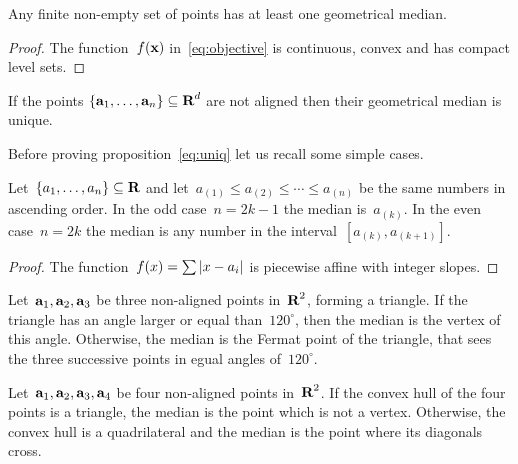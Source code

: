 \begin{proposition}
	Any finite non-empty set of points has at least one geometrical
	median.
\end{proposition}

\begin{proof}
	The function~$f(\textbf{x})$ in~\ref{eq:objective} is continuous, convex and
	has compact level sets.
\end{proof}

\begin{proposition}\label{eq:uniq}
If the points
\(
	\left\{\textbf{a}_1,\ldots,\textbf{a}_n\right\}\subseteq\textbf{R}^d
\)
are not aligned then their geometrical median is unique.
\end{proposition}

Before proving proposition~\ref{eq:uniq} let us recall some simple cases.

\begin{proposition}
Let~\( \left\{a_1,\ldots,a_n\right\}\subseteq\textbf{R} \)
and let~$a_{(1)}\le a_{(2)}\le\cdots\le a_{(n)}$
be the same numbers in
ascending order.  In the odd case~$n=2k-1$ the median is~$a_{(k)}$.  In the
even case~$n=2k$ the median is any number in the
interval~$\left[a_{(k)},a_{(k+1)}\right]$.
\end{proposition}

\begin{proof}
	The function~$f(x)=\sum \left|x-a_i\right|$ is piecewise affine with
	integer slopes.
\end{proof}

\begin{proposition}
	Let~$\textbf{a}_1,\textbf{a}_2,\textbf{a}_3$ be three non-aligned points in~$\textbf{R}^2$, forming a
	triangle.  If the triangle has an angle larger or equal
	than~$120^\circ$, then the median is the vertex of this angle.
	Otherwise, %
	the median is the Fermat point of the triangle, that sees the three
	successive points in egual angles of~$120^\circ$.
\end{proposition}

\begin{proposition}
	Let~$\textbf{a}_1,\textbf{a}_2,\textbf{a}_3,\textbf{a}_4$ be four non-aligned points in~$\textbf{R}^2$.  If the
	convex hull of the four points is a triangle, the median is the point
	which is not a vertex.  Otherwise, the convex hull is a quadrilateral
	and the median is the point where its diagonals cross.
\end{proposition}

